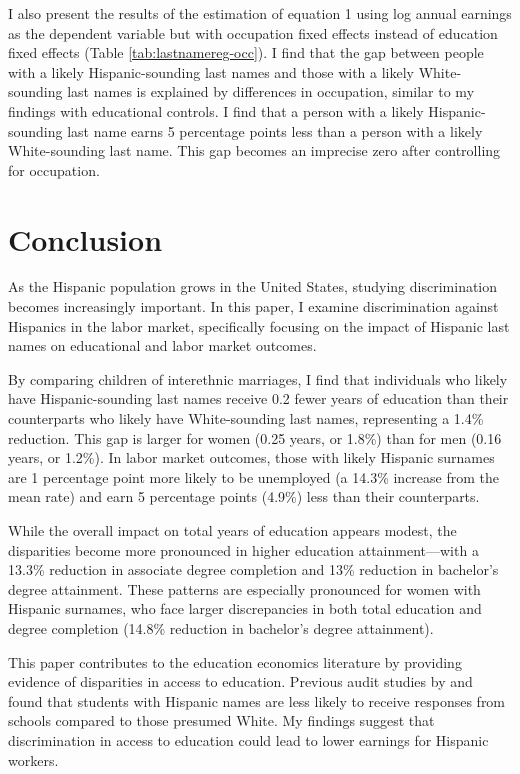 I also present the results of the estimation of equation 1 using log annual earnings as the dependent variable but with occupation fixed effects instead of education fixed effects (Table \ref{tab:lastnamereg-occ}). I find that the gap between people with a likely Hispanic-sounding last names and those with a likely White-sounding last names is explained by differences in occupation, similar to my findings with educational controls. I find that a person with a likely Hispanic-sounding last name earns 5 percentage points less than a person with a likely White-sounding last name. This gap becomes an imprecise zero after controlling for occupation.

\section{Conclusion}\label{sec:con1}

As the Hispanic population grows in the United States, studying discrimination becomes increasingly important. In this paper, I examine discrimination against Hispanics in the labor market, specifically focusing on the impact of Hispanic last names on educational and labor market outcomes.

By comparing children of interethnic marriages, I find that individuals who likely have Hispanic-sounding last names receive 0.2 fewer years of education than their counterparts who likely have White-sounding last names, representing a 1.4\% reduction. This gap is larger for women (0.25 years, or 1.8\%) than for men (0.16 years, or 1.2\%). In labor market outcomes, those with likely Hispanic surnames are 1 percentage point more likely to be unemployed (a 14.3\% increase from the mean rate) and earn 5 percentage points (4.9\%) less than their counterparts.

While the overall impact on total years of education appears modest, the disparities become more pronounced in higher education attainment—with a 13.3\% reduction in associate degree completion and 13\% reduction in bachelor's degree attainment. These patterns are especially pronounced for women with Hispanic surnames, who face larger discrepancies in both total education and degree completion (14.8\% reduction in bachelor's degree attainment).

This paper contributes to the education economics literature by providing evidence of disparities in access to education. Previous audit studies by \textcite{bergman2018education} and \textcite{gaddis2024racial} found that students with Hispanic names are less likely to receive responses from schools compared to those presumed White. My findings suggest that discrimination in access to education could lead to lower earnings for Hispanic workers.


